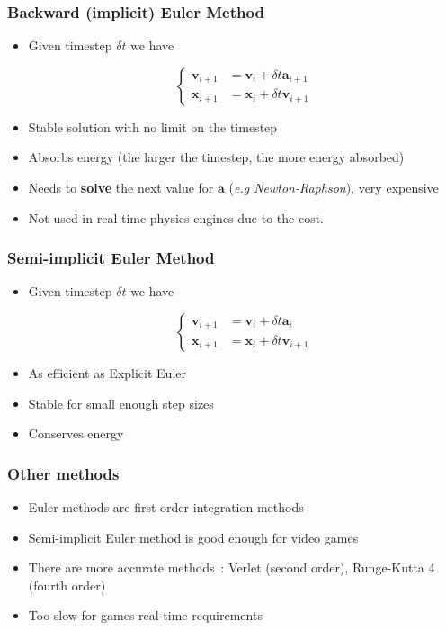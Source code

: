 \documentclass{beamer}
\begin{document}
\begin{frame}
  \frametitle{Backward (implicit) Euler Method}

  \begin{itemize}
  \item Given timestep $\delta t$ we have

    $$
    \begin{cases}
      \mathbf{v}_{i+1} &= \mathbf{v}_i + \delta t \mathbf{a}_{i+1}\\
      \mathbf{x}_{i+1} &= \mathbf{x}_i + \delta t \mathbf{v}_{i+1}
    \end{cases}
    $$

  \item Stable solution with no limit on the timestep
  \item Absorbs energy (the larger the timestep, the more energy absorbed)
  \pause
  \item Needs to \textbf{solve} the next value for $\mathbf{a}$ (\emph{e.g Newton-Raphson}), very expensive
  \item Not used in real-time physics engines due to the cost. 
  \end{itemize}
\end{frame}

\begin{frame}
  \frametitle{Semi-implicit Euler Method}

  \begin{itemize}
  \item Given timestep $\delta t$ we have

    $$
    \begin{cases}
      \mathbf{v}_{i+1} &= \mathbf{v}_i + \delta t \mathbf{a}_i\\
      \mathbf{x}_{i+1} &= \mathbf{x}_i + \delta t \mathbf{v}_{i+1}
    \end{cases}
    $$

  \item As efficient as Explicit Euler
  \item Stable for small enough step sizes
  \item Conserves energy
    
  \end{itemize}
\end{frame}

\begin{frame}
  \frametitle{Other methods}
  \begin{itemize}
  \item Euler methods are first order integration methods
  \item Semi-implicit Euler method is good enough for video games
  \item There are more accurate methods~:
    Verlet (second order), Runge-Kutta 4 (fourth order)
  \item Too slow for games real-time requirements
    
  \end{itemize}
\end{frame}
\end{document}
